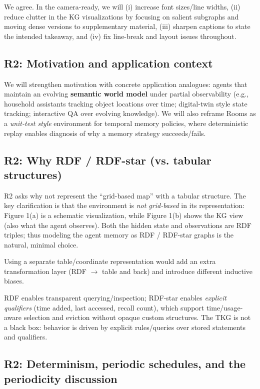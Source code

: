 \documentclass[runningheads]{llncs}
\begin{document}
We agree. In the camera-ready, we will (i) increase font sizes/line widths, (ii) reduce clutter in the KG visualizations by focusing on salient subgraphs and moving dense versions to supplementary material, (iii) sharpen captions to state the intended takeaway, and (iv) fix line-break and layout issues throughout.

\subsection*{R2: Motivation and application context}

We will strengthen motivation with concrete application analogues: agents that maintain an evolving \textbf{semantic world model} under partial observability (e.g., household assistants tracking object locations over time; digital-twin style state tracking; interactive QA over evolving knowledge). We will also reframe Rooms as a \emph{unit-test style} environment for temporal memory policies, where deterministic replay enables diagnosis of why a memory strategy succeeds/fails.

\subsection*{R2: Why RDF / RDF-star (vs. tabular structures)}

R2 asks why not represent the “grid-based map” with a tabular structure. The key clarification is that the environment is \emph{not grid-based} in its representation: Figure 1(a) is a schematic visualization, while Figure 1(b) shows the KG view (also what the agent observes). Both the hidden state and observations are RDF triples; thus modeling the agent memory as RDF / RDF-star graphs is the natural, minimal choice.

Using a separate table/coordinate representation would add an extra transformation layer (RDF $\rightarrow$ table and back) and introduce different inductive biases.

RDF enables transparent querying/inspection; RDF-star enables \emph{explicit qualifiers} (time added, last accessed, recall count), which support time/usage-aware selection and eviction without opaque custom structures. The TKG is not a black box: behavior is driven by explicit rules/queries over stored statements and qualifiers.

\subsection*{R2: Determinism, periodic schedules, and the periodicity discussion}
\end{document}
